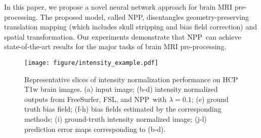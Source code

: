 \documentclass[runningheads]{llncs}
\newcommand{\modelname}{NPP}
\begin{document}
In this paper, we propose a novel neural network approach for brain MRI pre-processing. The proposed model, called \modelname, disentangles geometry-preserving translation mapping (which includes skull stripping and bias field correction) and spatial transformation. 
Our experiments demonstrate that \modelname~can achieve state-of-the-art results for the major tasks of brain MRI pre-processing.

\begin{figure}[t!]
\centering
\texttt{[image: figure/intensity\_example.pdf]}
\caption{Representative slices of intensity normalization performance on HCP T1w brain images. (a) input image; (b-d) intensity normalized outputs from FreeSurfer, FSL, and \modelname~with $\lambda=0.1$; (e) ground truth bias field; (f-h) bias fields estimated by the corresponding methods; (i) ground-truth intensity normalized image; (j-l) prediction error maps corresponding to (b-d).} 
\label{fig_ie}
\end{figure}


\end{document}
